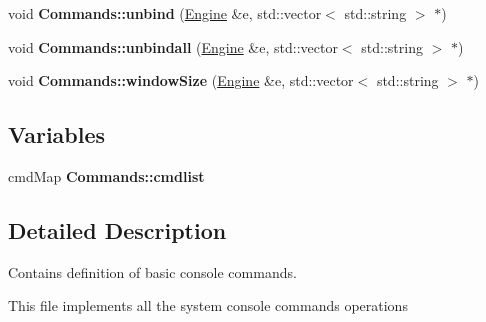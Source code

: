 \begin{DoxyCompactItemize}
\item 
void {\bfseries Commands\+::unbind} (\hyperlink{classEngine}{Engine} \&e, std\+::vector$<$ std\+::string $>$ $\ast$)\hypertarget{Commands_8hh_aecb0f8c2aa97a861b3f7e096fa1c3753}{}\label{Commands_8hh_aecb0f8c2aa97a861b3f7e096fa1c3753}

\item 
void {\bfseries Commands\+::unbindall} (\hyperlink{classEngine}{Engine} \&e, std\+::vector$<$ std\+::string $>$ $\ast$)\hypertarget{Commands_8hh_aaf5fdc6ec45762f26fdd7c5edf9aeb55}{}\label{Commands_8hh_aaf5fdc6ec45762f26fdd7c5edf9aeb55}

\item 
void {\bfseries Commands\+::window\+Size} (\hyperlink{classEngine}{Engine} \&e, std\+::vector$<$ std\+::string $>$ $\ast$)\hypertarget{Commands_8hh_a1877584a3f78f6e917ad075f6f047c27}{}\label{Commands_8hh_a1877584a3f78f6e917ad075f6f047c27}

\end{DoxyCompactItemize}
\subsection*{Variables}
\begin{DoxyCompactItemize}
\item 
cmd\+Map {\bfseries Commands\+::cmdlist}\hypertarget{Commands_8hh_a858b3a3d3caa824a70c877892ff9e2a4}{}\label{Commands_8hh_a858b3a3d3caa824a70c877892ff9e2a4}

\end{DoxyCompactItemize}


\subsection{Detailed Description}
Contains definition of basic console commands. 

This file implements all the system console commands operations 
